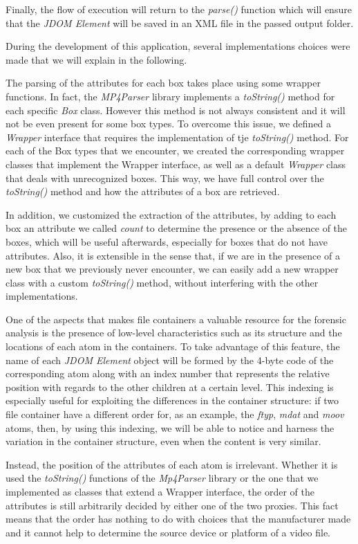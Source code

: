 Finally, the flow of execution will return to the \emph{parse()} function which will ensure that the \emph{JDOM Element} will be saved in an XML file in the passed output folder.

During the development of this application, several implementations choices were made that we will explain in the following.

The parsing of the attributes for each box takes place using some wrapper functions. In fact, the \emph{MP4Parser} library implements a \emph{toString()} method for each specific \emph{Box} class. However this method is not always consistent and it will not be even present for some box types. To overcome this issue, we defined a \emph{Wrapper} interface that requires the implementation of tje \emph{toString()} method. For each of the Box types that we encounter, we created the corresponding wrapper classes that implement the Wrapper interface, as well as a default \emph{Wrapper} class that deals with unrecognized boxes. This way, we have full control over the \emph{toString()} method and how the attributes of a box are retrieved. 

In addition, we customized the extraction of the attributes, by adding to each box an attribute we called \emph{count} to determine the presence or the absence of the boxes, which will be useful afterwards, especially for boxes that do not have attributes.
Also, it is extensible in the sense that, if we are in the presence of a new box that we previously never encounter, we can easily add a new wrapper class with a custom \emph{toString()} method, without interfering with the other implementations.

One of the aspects that makes file containers a valuable resource for the forensic analysis is the presence of low-level characteristics such as its structure and the locations of each atom in the containers. To take advantage of this feature, the name of each \emph{JDOM Element} object will be formed by the 4-byte code of the corresponding atom along with an index number that represents the relative position with regards to the other children at a certain level. This indexing is especially useful for exploiting the differences in the container structure: if two file container have a different order for, as an example, the \emph{ftyp}, \emph{mdat} and \emph{moov} atoms, then, by using this indexing, we will be able to notice and harness the variation in the container structure, even when the content is very similar.

Instead, the position of the attributes of each atom is irrelevant. Whether it is used the \emph{toString()} functions of the \emph{Mp4Parser} library or the one that we implemented as classes that extend a Wrapper interface, the order of the attributes is still arbitrarily decided by either one of the two proxies. This fact means that the order has nothing to do with choices that the manufacturer made and it cannot help to determine the source device or platform of a video file.

